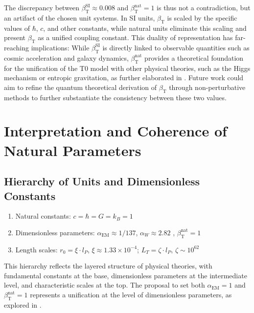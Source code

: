 \documentclass[12pt,a4paper]{article}
\newcommand{\alphaEM}{\alpha_{\text{EM}}}
\newcommand{\betaT}{\beta_{\text{T}}}
\begin{document}
	The discrepancy between \(\betaT^{\text{SI}} \approx 0.008\) and \(\betaT^{\text{nat}} = 1\) is thus not a contradiction, but an artifact of the chosen unit systems. In SI units, \(\betaT\) is scaled by the specific values of \(\hbar\), \(c\), and other constants, while natural units eliminate this scaling and present \(\betaT\) as a unified coupling constant. This duality of representation has far-reaching implications: While \(\betaT^{\text{SI}}\) is directly linked to observable quantities such as cosmic acceleration and galaxy dynamics, \(\betaT^{\text{nat}}\) provides a theoretical foundation for the unification of the T0 model with other physical theories, such as the Higgs mechanism or entropic gravitation, as further elaborated in \cite{pascher_emergente_gravitation_2025}. Future work could aim to refine the quantum theoretical derivation of \(\betaT\) through non-perturbative methods to further substantiate the consistency between these two values.
	
	\section{Interpretation and Coherence of Natural Parameters}
	\label{sec:interpretation}
	
	\subsection{Hierarchy of Units and Dimensionless Constants}
	\label{subsec:hierarchy_units}
	
	\begin{enumerate}
		\item Natural constants: \(c = \hbar = G = k_B = 1\)
		\item Dimensionless parameters: \(\alphaEM \approx 1/137\), \(\alpha_W \approx 2.82\) \cite{pascher_temp_2025}, \(\betaT^{\text{nat}} = 1\)
		\item Length scales: \(r_0 = \xi \cdot l_P\), \(\xi \approx 1.33 \times 10^{-4}\); \(L_T = \zeta \cdot l_P\), \(\zeta \sim 10^{62}\)
	\end{enumerate}
	
	This hierarchy reflects the layered structure of physical theories, with fundamental constants at the base, dimensionless parameters at the intermediate level, and characteristic scales at the top. The proposal to set both \(\alphaEM = 1\) and \(\betaT^{\text{nat}} = 1\) represents a unification at the level of dimensionless parameters, as explored in \cite{pascher_alphabeta_2025}.
	
\end{document}
